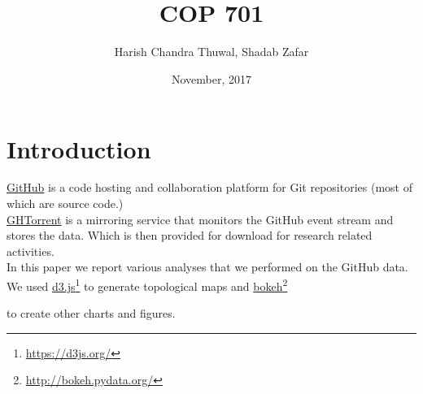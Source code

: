 \documentclass{article}
\title{
  \bold{Final Project Report} \\
  \large COP 701
}
\author{
    Harish Chandra Thuwal, Shadab Zafar
}
\date{November, 2017}
\newcommand\fnurl[2]{
    \href{#2}{#1}\footnote{\url{#2}}
}
\begin{document}
\maketitle

\vspace{15px}
\renewcommand{\baselinestretch}{1.35}\normalsize
\tableofcontents
\renewcommand{\baselinestretch}{1.0}\normalsize


\newpage
\section{Introduction}

\href{http://github.com/}{GitHub} is a code hosting and collaboration platform for Git repositories
(most of which are source code.) \\

\href{http://ghtorrent.org/}{GHTorrent} is a mirroring service that monitors the GitHub event stream and
stores the data. Which is then provided for download for research related
activities. \\

In this paper we report various analyses that we performed on the GitHub data. \\

We used \fnurl{d3.js}{https://d3js.org/} to generate topological maps and \fnurl{bokeh}{http://bokeh.pydata.org/}
to create other charts and figures.

\vspace{20px}


\end{document}
